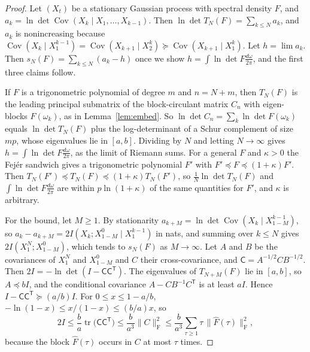 \documentclass[11pt,onecolumn]{IEEEtran}
\newcommand{\tr}{\operatorname{tr}}
\newcommand{\Cov}{\operatorname{Cov}}
\newcommand{\dw}{\tfrac{d\omega}{2\pi}}
\begin{document}
\begin{proof}
Let $(X_t)$ be a stationary Gaussian process with spectral density $F$,
and $a_k=\ln\det\Cov(X_k\mid X_1,\dots,X_{k-1})$. Then
$\ln\det T_N(F)=\sum_{k\le N}a_k$, and $a_k$ is nonincreasing because
$\Cov(X_k\mid X_1^{k-1})=\Cov(X_{k+1}\mid X_2^{k})\succeq\Cov(X_{k+1}\mid X_1^{k})$.
Let $h=\lim a_k$. Then $s_N(F)=\sum_{k\le N}(a_k-h)$ once we show
$h=\int\ln\det F\dw$, and the first three claims follow.

If $F$ is a trigonometric polynomial of degree $m$ and $n=N+m$, then $T_N(F)$ is the leading principal submatrix of the
block-circulant matrix $C_n$ with eigen-blocks $F(\omega_k)$, as in
Lemma~\ref{lem:embed}. So $\ln\det C_n=\sum_k\ln\det F(\omega_k)$ equals
$\ln\det T_N(F)$ plus the log-determinant of a Schur complement of size
$mp$, whose eigenvalues lie in $[a,b]$. Dividing by $N$ and letting
$N\to\infty$ gives $h=\int\ln\det F\dw$, as the limit of Riemann sums.
For a general $F$ and $\kappa>0$ the Fej\'er sandwich gives a
trigonometric polynomial $F'$ with $F'\preceq F\preceq(1+\kappa)F'$.
Then $T_N(F')\preceq T_N(F)\preceq(1+\kappa)T_N(F')$, so
$\tfrac1N\ln\det T_N(F)$ and $\int\ln\det F\dw$ are within
$p\ln(1+\kappa)$ of the same quantities for $F'$, and $\kappa$ is
arbitrary.

For the bound, let $M\ge1$. By stationarity
$a_{k+M}=\ln\det\Cov(X_k\mid X_{1-M}^{k-1})$, so
$a_k-a_{k+M}=2I(X_k;X_{1-M}^0\mid X_1^{k-1})$ in nats, and summing over
$k\le N$ gives $2I(X_1^N;X_{1-M}^0)$, which tends to $s_N(F)$ as
$M\to\infty$. Let $A$ and $B$ be the covariances of $X_1^N$ and
$X_{1-M}^0$ and $C$ their cross-covariance, and
$\mathsf C=A^{-1/2}CB^{-1/2}$. Then
$2I=-\ln\det(I-\mathsf C\mathsf C^{\mathsf T})$. The eigenvalues of
$T_{N+M}(F)$ lie in $[a,b]$, so $A\preceq bI$, and the conditional
covariance $A-CB^{-1}C^{\mathsf T}$ is at least $aI$. Hence
$I-\mathsf C\mathsf C^{\mathsf T}\succeq(a/b)I$. For $0\le x\le1-a/b$,
$-\ln(1-x)\le x/(1-x)\le(b/a)x$, so
\[
2I\le\frac ba\tr\bigl(\mathsf C\mathsf C^{\mathsf T}\bigr)\le\frac b{a^3}\|C\|_{\mathrm F}^2
\le\frac b{a^3}\sum_{\tau\ge1}\tau\,\bigl\|\hat F(\tau)\bigr\|_{\mathrm F}^2 ,
\]
because the block $\hat F(\tau)$ occurs in $C$ at most $\tau$ times.
\end{proof}
\end{document}
